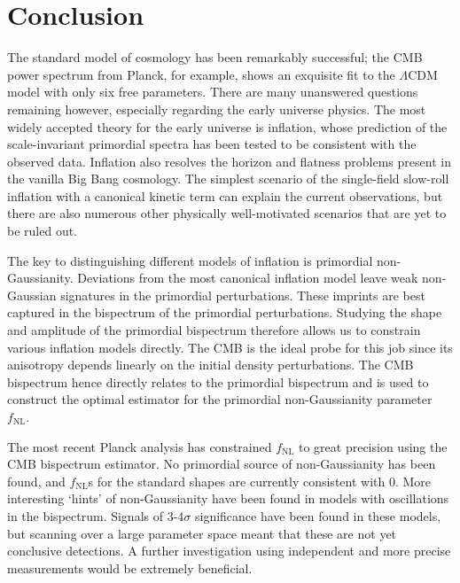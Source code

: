 \chapter{Conclusion}

The standard model of cosmology has been remarkably successful; the CMB power spectrum from Planck, for example, shows an exquisite fit to the $\Lambda$CDM model with only six free parameters. There are many unanswered questions remaining however, especially regarding the early universe physics. The most widely accepted theory for the early universe is inflation, whose prediction of the scale-invariant primordial spectra has been tested to be consistent with the observed data. Inflation also resolves the horizon and flatness problems present in the vanilla Big Bang cosmology. The simplest scenario of the single-field slow-roll inflation with a canonical kinetic term can explain the current observations, but there are also numerous other physically well-motivated scenarios that are yet to be ruled out.

The key to distinguishing different models of inflation is primordial non-Gaussianity. Deviations from the most canonical inflation model leave weak non-Gaussian signatures in the primordial perturbations. These imprints are best captured in the bispectrum of the primordial perturbations. Studying the shape and amplitude of the primordial bispectrum therefore allows us to constrain various inflation models directly. The CMB is the ideal probe for this job since its anisotropy depends linearly on the initial density perturbations. The CMB bispectrum hence directly relates to the primordial bispectrum and is used to construct the optimal estimator for the primordial non-Gaussianity parameter $f_\text{NL}$. 

The most recent Planck analysis has constrained $f_\text{NL}$ to great precision using the CMB bispectrum estimator. No primordial source of non-Gaussianity has been found, and $f_\text{NL}$s for the standard shapes are currently consistent with $0$. More interesting `hints' of non-Gaussianity have been found in models with oscillations in the bispectrum. Signals of $3$-$4\sigma$ significance have been found in these models, but scanning over a large parameter space meant that these are not yet conclusive detections. A further investigation using independent and more precise measurements would be extremely beneficial.


